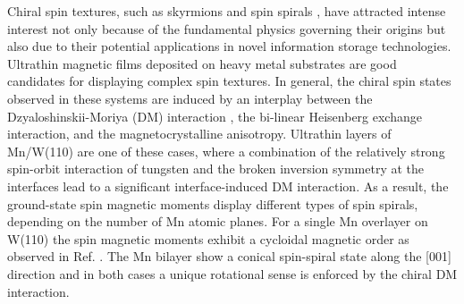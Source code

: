 \documentclass[prl,final,twocolumn]{revtex4-1}
\begin{document}
 Chiral spin textures, such as skyrmions  \cite{fert2013skyrmions,romming2013writing} and spin spirals 
 \cite{yoshida2012conical,bode2007chiral,menzel2012information,steinbrecher2018non}, 
 have attracted intense interest not only because of the fundamental physics governing their origins but also due to their potential applications in novel information storage technologies.
Ultrathin magnetic films deposited on heavy metal substrates are good candidates for displaying complex spin textures. 
In general, the chiral spin states observed in these systems are induced by an interplay between the Dzyaloshinskii-Moriya (DM) interaction 
\cite{dzyaloshinskyThermodynamicTheoryWeak1958,moriyaAnisotropicSuperexchangeInteraction1960}, the bi-linear Heisenberg  exchange interaction, 
and the magnetocrystalline anisotropy.
Ultrathin layers of Mn/W(110) \cite{yoshida2012conical,bode2007chiral} are one of these cases, where a combination of the relatively strong spin-orbit interaction of tungsten and the broken inversion symmetry at the interfaces lead to a significant interface-induced DM interaction. As a result, the ground-state spin magnetic moments display different types of spin spirals, depending on the number of Mn atomic planes. For a single Mn overlayer on W(110) the spin magnetic moments exhibit a cycloidal magnetic order as observed in Ref. . The Mn bilayer show a conical spin-spiral state along the [001] direction \cite{yoshida2012conical} and in both cases a unique rotational sense is enforced by the chiral DM interaction.
\end{document}
